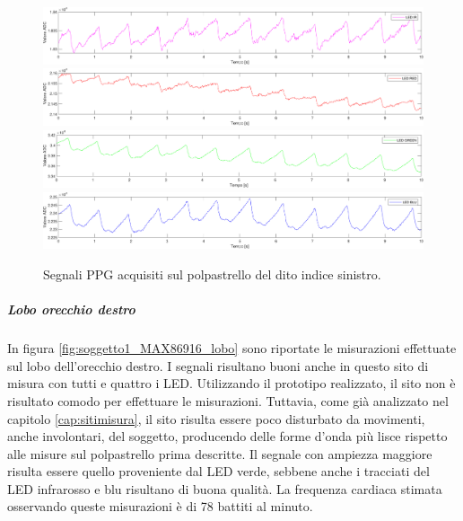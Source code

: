 \begin{figure}[h]
	\centering
	\includegraphics[width=1\linewidth]{ImageFiles/Misure Preliminari/Soggetto 1/MAX86916/polpastrello_ired}
	\includegraphics[width=1\linewidth]{ImageFiles/Misure Preliminari/Soggetto 1/MAX86916/polpastrello_red}
	\includegraphics[width=1\linewidth]{ImageFiles/Misure Preliminari/Soggetto 1/MAX86916/polpastrello_green}
	\includegraphics[width=1\linewidth]{ImageFiles/Misure Preliminari/Soggetto 1/MAX86916/polpastrello_blu}
	\caption{Segnali PPG acquisiti sul polpastrello del dito indice sinistro.}
	\label{fig:soggetto1_MAX86916_polpastrello}
\end{figure}

\clearpage

\subparagraph{Lobo orecchio destro}

In figura \ref{fig:soggetto1_MAX86916_lobo} sono riportate le misurazioni effettuate sul lobo dell'orecchio destro. I segnali risultano buoni anche in questo sito di misura con tutti e quattro i LED. Utilizzando il prototipo realizzato, il sito non è risultato comodo per effettuare le misurazioni. Tuttavia, come già analizzato nel capitolo \ref{cap:sitimisura}, il sito risulta essere poco disturbato da movimenti, anche involontari, del soggetto, producendo delle forme d'onda più lisce rispetto alle misure sul polpastrello prima descritte. Il segnale con ampiezza maggiore risulta essere quello proveniente dal LED verde, sebbene anche i tracciati del LED infrarosso e blu risultano di buona qualità. La frequenza cardiaca stimata osservando queste misurazioni è di 78 battiti al minuto.


